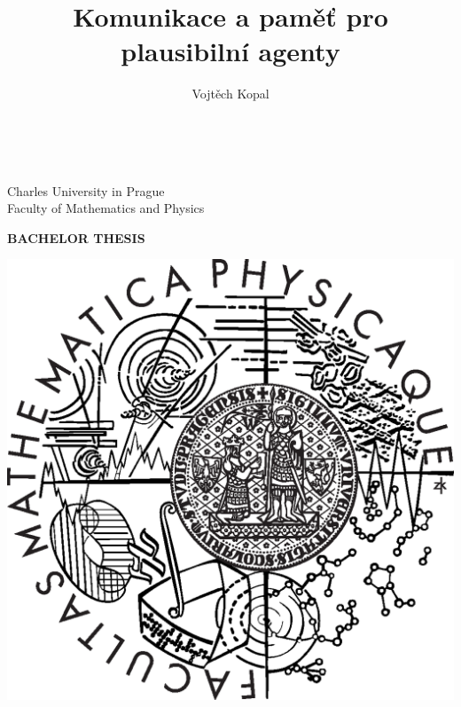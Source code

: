 \documentclass[12pt,notitlepage]{report}
\title{Komunikace a paměť pro plausibilní agenty}   %
\author{Vojtěch Kopal} %
\begin{document}

\begin{titlepage}
\begin{center}
\ \\

\vspace{15mm}

\large
Charles University in Prague\\
Faculty of Mathematics and Physics\\

\vspace{5mm}
   
{\Large\bf BACHELOR THESIS}

\vspace{10mm}

\includegraphics[scale=0.3]{logo.eps} 


\end{center}
\end{titlepage}
\end{document}
